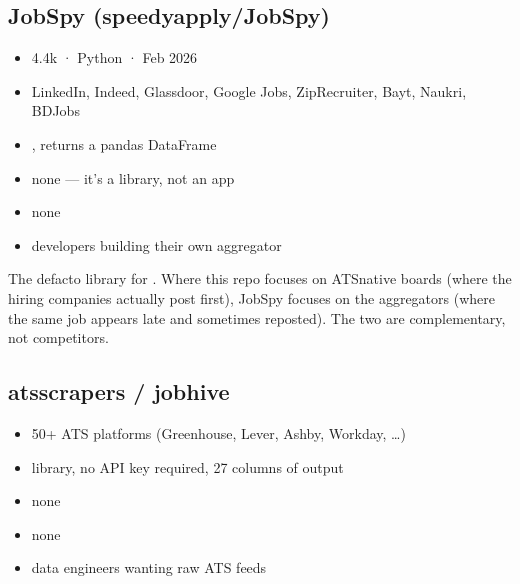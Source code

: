 \documentclass[a4paper,11pt,english]{sphinxmanual}
\begin{document}
\subsection{JobSpy (speedyapply/JobSpy)}
\label{\detokenize{analysis:jobspy-speedyapply-jobspy}}\begin{itemize}
\item {} 
\sphinxAtStartPar
{} 4.4k ·  Python ·  Feb 2026

\item {} 
\sphinxAtStartPar
{} LinkedIn, Indeed, Glassdoor, Google Jobs, ZipRecruiter,
Bayt, Naukri, BDJobs

\item {} 
\sphinxAtStartPar
{} , returns a pandas DataFrame

\item {} 
\sphinxAtStartPar
{} none — it’s a library, not an app

\item {} 
\sphinxAtStartPar
{} none

\item {} 
\sphinxAtStartPar
{} developers building their own aggregator

\end{itemize}

\sphinxAtStartPar
{} The de\sphinxhyphen{}facto library for . Where this repo
focuses on ATS\sphinxhyphen{}native boards (where the hiring companies actually post
first), JobSpy focuses on the aggregators (where the same job appears
late and sometimes reposted). The two are complementary, not competitors.


\subsection{ats\sphinxhyphen{}scrapers / jobhive}
\label{\detokenize{analysis:ats-scrapers-jobhive}}\begin{itemize}
\item {} 
\sphinxAtStartPar
{} 50+ ATS platforms (Greenhouse, Lever, Ashby, Workday, …)

\item {} 
\sphinxAtStartPar
{} library, no API key required, 27 columns of output

\item {} 
\sphinxAtStartPar
{} none

\item {} 
\sphinxAtStartPar
{} none

\item {} 
\sphinxAtStartPar
{} data engineers wanting raw ATS feeds

\end{itemize}
\end{document}
